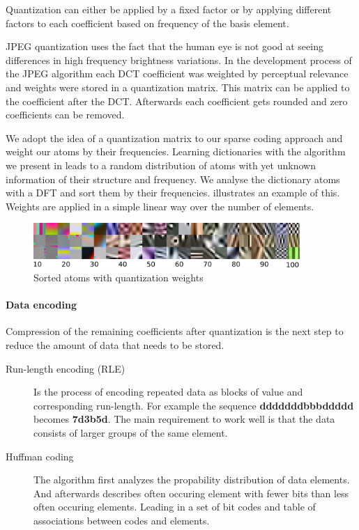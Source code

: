 Quantization can either be applied by a fixed factor or by applying different 
factors to each coefficient based on frequency of the basis element.

JPEG quantization uses the fact that the human eye is not good at seeing
differences in high frequency brightness variations. In the development
process of the JPEG algorithm each DCT coefficient was weighted by perceptual
relevance and weights were stored in a quantization matrix. 
This matrix can be applied to the coefficient after the DCT. 
Afterwards each coefficient gets rounded and zero coefficients can be removed.

We adopt the idea of a quantization matrix to our sparse coding approach and
weight our atoms by their frequencies. Learning dictionaries with the
algorithm we present in  leads to a random distribution of
atoms with yet unknown information of their structure and frequency. We analyse
the dictionary atoms with a DFT and sort them by their frequencies.
 illustrates an example of this. Weights are applied
in a simple linear way over the number of elements.

\begin{figure}[h]
\centering
\includegraphics[width = 0.90\textwidth]{images/sorted.pdf}
\caption{Sorted atoms with quantization weights}
\label{fig:sorted}
\end{figure}

\paragraph{Data encoding}
Compression of the remaining coefficients after quantization is the next step
to reduce the amount of data that needs to be stored.

\begin{description}
 \item[Run-length encoding (RLE)] Is the process of encoding repeated data as
blocks of value and corresponding run-length. 
For example the sequence {\bf dddddddbbbddddd} becomes {\bf7d3b5d}.
The main requirement to work well is that the data consists of larger groups of
the same element.
  \item[Huffman coding] The algorithm first analyzes the propability 
distribution of data elements. And afterwards describes often occuring element
with fewer bits than less often occuring elements. Leading in a set of
bit codes and table of associations between codes and elements. 
\end{description}

